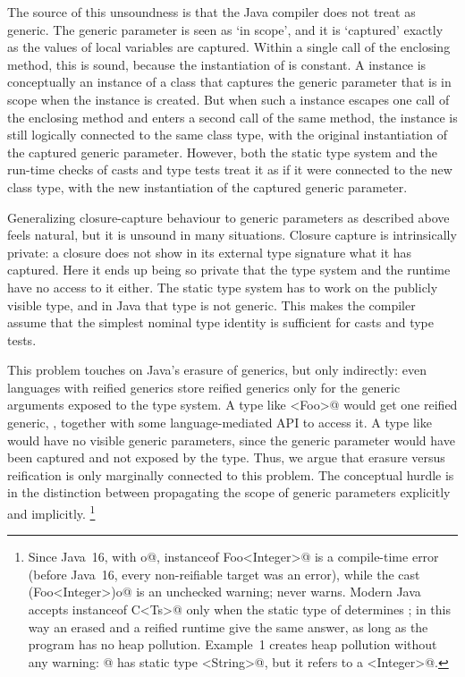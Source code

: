 The source of this unsoundness is that the Java compiler does not treat \Q@MyFoo@ as generic.
The generic parameter \Q@X@ is seen as `in scope', and it is `captured' exactly as the values of local variables are captured.
Within a single call of the enclosing method, this is sound, because the instantiation of \Q@X@ is constant.
A \Q@MyFoo@ instance is conceptually an instance of a class that captures the
generic parameter that is in scope when the instance is created.
But when such a \Q@MyFoo@ instance escapes one call of the enclosing method and enters a second call of the same method,
the instance is still logically connected to the same class type, with the original instantiation of the captured generic parameter.
However, both the static type system and the run-time checks of casts and type tests treat it as if it were connected to the new class type, with the new instantiation of the captured generic parameter.

Generalizing closure-capture behaviour to generic parameters as described above feels natural, but it is unsound in many situations.
Closure capture is intrinsically private: a closure does not show in its external type signature what it has captured. Here it ends up being so private that the type system and the runtime have no access to it either.
The static type system has to work on the publicly visible type, and in Java that type is not generic.
This makes the compiler assume that the simplest nominal type identity is sufficient for casts and type tests.

This problem touches on Java's erasure of generics, but only indirectly: even languages with reified generics store reified generics only for the generic arguments exposed to the type system.
A type like \Q@List<Foo>@ would get one reified generic, \Q@Foo@, together with some language-mediated API to access it.
A type like \Q@MyFoo@ would have no visible generic parameters, since the generic parameter would have been captured and not exposed by the type.
Thus, we argue that erasure versus reification is only marginally connected to this problem. The conceptual hurdle is in the distinction between propagating the scope of generic parameters explicitly and implicitly.%
\footnote{Since Java~16, with \Q@Object o@, \Q@o instanceof Foo<Integer>@ is a compile-time error (before Java~16, every non-reifiable \Q@instanceof@ target was an error), while the cast \Q@(Foo<Integer>)o@ is an unchecked warning; \Q@instanceof@ never warns.
Modern Java accepts \Q@o instanceof C<Ts>@ only when the static type of \Q@o@ determines \Q@Ts@; in this way an erased and a reified runtime give the same answer, as long as the program has no heap pollution.
Example~1 creates heap pollution without any warning: @ has static type \Q@Foo<String>@, but it refers to a \Q@Foo<Integer>@.}

